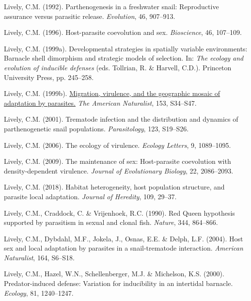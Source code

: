 \documentclass[
  american,
  letterpaper,
]{book}
\newlength{\cslhangindent}
\newenvironment{CSLReferences}[2] %
 {\begin{list}{}{%
  \setlength{\itemindent}{0pt}
  \setlength{\leftmargin}{0pt}
  \setlength{\parsep}{0pt}
  \ifodd #1
   \setlength{\leftmargin}{\cslhangindent}
   \setlength{\itemindent}{-1\cslhangindent}
  \fi
  \setlength{\itemsep}{#2\baselineskip}}}
 {\end{list}}
\begin{document}
\begin{CSLReferences}{1}{0}
Lively, C.M. (1992). Parthenogenesis in a freshwater snail: Reproductive
assurance versus parasitic release. \emph{Evolution}, 46, 907--913.

Lively, C.M. (1996). Host-parasite coevolution and sex.
\emph{Bioscience}, 46, 107--109.

Lively, C.M. (1999a). Developmental strategies in spatially variable
environments: Barnacle shell dimorphism and strategic models of
selection. In: \emph{The ecology and evolution of inducible defenses}
(eds. Tollrian, R. \& Harvell, C.D.). Princeton University Press, pp.
245--258.

Lively, C.M. (1999b). \href{https://doi.org/10.1086/303210}{Migration,
virulence, and the geographic mosaic of adaptation by parasites.}
\emph{The American Naturalist}, 153, S34--S47.

Lively, C.M. (2001). Trematode infection and the distribution and
dynamics of parthenogenetic snail populations. \emph{Parasitology}, 123,
S19--S26.

Lively, C.M. (2006). The ecology of virulence. \emph{Ecology Letters},
9, 1089--1095.

Lively, C.M. (2009). The maintenance of sex: Host-parasite coevolution
with density-dependent virulence. \emph{Journal of Evolutionary
Biology}, 22, 2086--2093.

Lively, C.M. (2018). Habitat heterogeneity, host population structure,
and parasite local adaptation. \emph{Journal of Heredity}, 109, 29--37.

Lively, C.M., Craddock, C. \& Vrijenhoek, R.C. (1990). {Red Queen}
hypothesis supported by parasitism in sexual and clonal fish.
\emph{Nature}, 344, 864--866.

Lively, C.M., Dybdahl, M.F., Jokela, J., Osnas, E.E. \& Delph, L.F.
(2004). Host sex and local adaptation by parasites in a snail-trematode
interaction. \emph{American Naturalist}, 164, S6--S18.

Lively, C.M., Hazel, W.N., Schellenberger, M.J. \& Michelson, K.S.
(2000). Predator-induced defense: Variation for inducibility in an
intertidal barnacle. \emph{Ecology}, 81, 1240--1247.


\end{CSLReferences}
\end{document}

